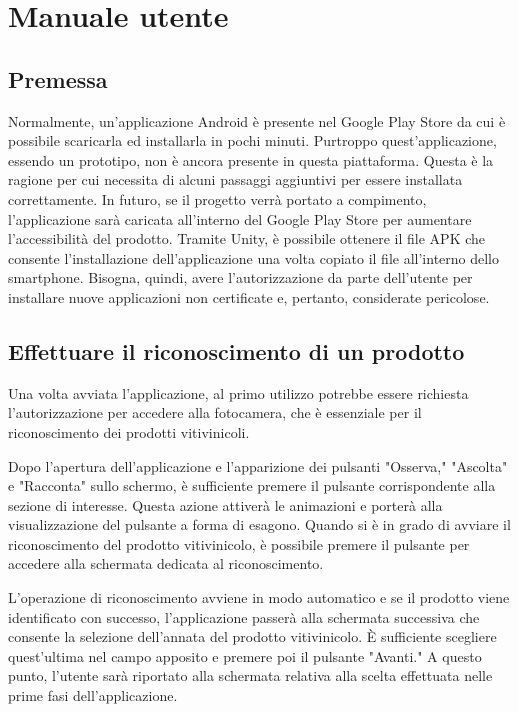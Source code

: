 \section{Manuale utente}

\subsection{Premessa}

Normalmente, un'applicazione Android è presente nel Google Play Store da cui è possibile scaricarla ed installarla in pochi minuti. Purtroppo quest'applicazione, essendo un prototipo, non è ancora presente in questa piattaforma. Questa è la ragione per cui necessita di alcuni passaggi aggiuntivi per essere installata correttamente. In futuro, se il progetto verrà portato a compimento, l'applicazione sarà caricata all'interno del Google Play Store per aumentare l'accessibilità del prodotto. Tramite Unity, è possibile ottenere il file APK che consente l'installazione dell'applicazione una volta copiato il file all'interno dello smartphone. Bisogna, quindi, avere l'autorizzazione da parte dell'utente per installare nuove applicazioni non certificate e, pertanto, considerate pericolose.

\subsection{Effettuare il riconoscimento di un prodotto}

Una volta avviata l'applicazione, al primo utilizzo potrebbe essere richiesta l'autorizzazione per accedere alla fotocamera, che è essenziale per il riconoscimento dei prodotti vitivinicoli.

Dopo l'apertura dell'applicazione e l'apparizione dei pulsanti "Osserva," "Ascolta" e "Racconta" sullo schermo, è sufficiente premere il pulsante corrispondente alla sezione di interesse. Questa azione attiverà le animazioni e porterà alla visualizzazione del pulsante a forma di esagono. Quando si è in grado di avviare il riconoscimento del prodotto vitivinicolo, è possibile premere il pulsante per accedere alla schermata dedicata al riconoscimento.

L'operazione di riconoscimento avviene in modo automatico e se il prodotto viene identificato con successo, l'applicazione passerà alla schermata successiva che consente la selezione dell'annata del prodotto vitivinicolo. È sufficiente scegliere quest'ultima nel campo apposito e premere poi il pulsante "Avanti." A questo punto, l'utente sarà riportato alla schermata relativa alla scelta effettuata nelle prime fasi dell'applicazione.

